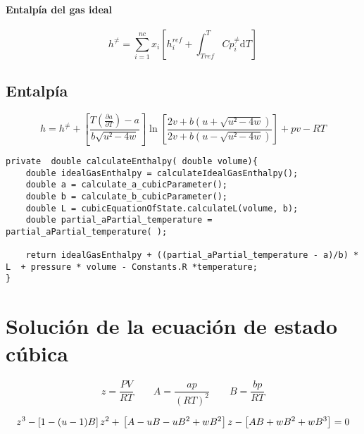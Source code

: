 \subsubsection{Entalpía del gas ideal}
\begin{equation}\label{eq:idealgasenthalpy}
h^{\neq} = \sum_{i=1}^{nc} x_i \left[ h_i^{ref} + \int_{Tref}^{T} Cp_i^{\neq} \mathrm{d}T \right]
\end{equation}

\section{Entalpía}
\begin{equation}\label{eq:enthalpy}
h = h^{\neq} + \left[ \frac{T(\frac{\partial a}{\partial T}) - a}{b\sqrt{u²-4w} }\right] 
\ln\left[\frac{2v+b\left(u + \sqrt{u²-4w}\right)}{2v+b\left(u - \sqrt{u²-4w}\right)}\right]
+ pv - RT
\end{equation}

\begin{lstlisting}[label=some-code,caption=Some Code]
private  double calculateEnthalpy( double volume){
    double idealGasEnthalpy = calculateIdealGasEnthalpy();
    double a = calculate_a_cubicParameter();
    double b = calculate_b_cubicParameter();
    double L = cubicEquationOfState.calculateL(volume, b);
    double partial_aPartial_temperature = partial_aPartial_temperature( );
    
    return idealGasEnthalpy + ((partial_aPartial_temperature - a)/b) * L  + pressure * volume - Constants.R *temperature;
}
\end{lstlisting}	



\chapter{Solución de la ecuación de estado cúbica}\label{chap:cubicsolution}



\begin{equation}
z= \frac{P V}{R T}
\qquad
A=\frac{ap}{(RT)^2}
\qquad
B=\frac{bp}{RT}
\end{equation}

\begin{equation}
z^3-\left[1-(u-1)B\right]z^2+ \\ \left[A-uB-uB^2 +\\ wB^2\right]z-\left[AB+wB^2+wB^3\right]=0
\end{equation}


